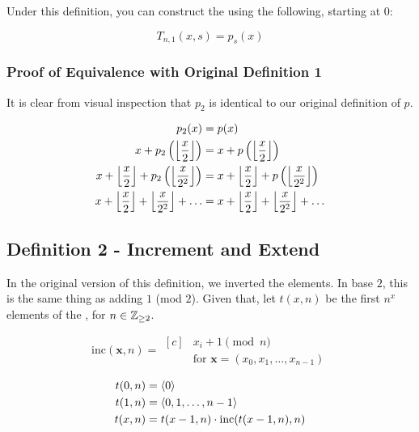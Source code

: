 \documentclass[conference]{IEEEtran}
\begin{document}
Under this definition, you can construct the \TMS using the following, starting at 0:

\begin{equation}
    T_{n,1}(x, s) = p_s(x)
\end{equation}

\subsubsection{Proof of Equivalence with Original Definition 1}

It is clear from visual inspection that $p_2$ is identical to our original definition of $p$.

\begin{equation}
    \begin{aligned}
                                                           p_2(x) &= p(x) \\
                         x + p_2\left(\left\lfloor \dfrac{x}{2} \right\rfloor\right) &= x + p\left(\left\lfloor \dfrac{x}{2} \right\rfloor\right) \\
x + \left\lfloor \dfrac{x}{2} \right\rfloor + p_2\left(\left\lfloor \dfrac{x}{2^2} \right\rfloor\right) &= x + \left\lfloor \dfrac{x}{2} \right\rfloor + p\left(\left\lfloor \dfrac{x}{2^2} \right\rfloor\right) \\
       x + \left\lfloor \dfrac{x}{2} \right\rfloor + \left\lfloor \dfrac{x}{2^2} \right\rfloor + \ldots &= x + \left\lfloor \dfrac{x}{2} \right\rfloor + \left\lfloor \dfrac{x}{2^2} \right\rfloor + \ldots
    \end{aligned}
\end{equation}

\subsection{Definition 2 - Increment and Extend}

In the original version of this definition, we inverted the elements. In base $2$, this is the same thing as adding $1$ (mod $2$). Given that, let $t(x, n)$ be the first $n^x$ elements of the \ETMS, for $n \in \mathbb{Z}_{\ge 2}$.

\begin{equation}
    \text{inc}(\mathbf{x}, n) = \begin{aligned}[c]
            &x_i + 1 \pmod{n} \\
            &\text{for } \mathbf{x} = (x_0, x_1, \ldots, x_{n-1})
    \end{aligned}
\end{equation}

\begin{equation}
    \begin{aligned}
t(0, n) &= \langle 0 \rangle \\
t(1, n) &= \langle 0, 1, \ldots, n - 1 \rangle \\
t(x, n) &= t(x - 1, n) \cdot \text{inc}(t(x - 1, n), n)
    \end{aligned}
\end{equation}
\end{document}
